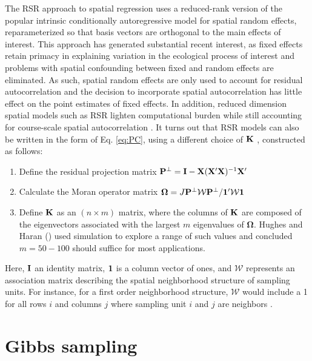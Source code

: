 \documentclass[12pt,fleqn]{article}
\begin{document}
\begin{flushleft}
The RSR approach to spatial regression uses a reduced-rank version of the popular intrinsic conditionally autoregressive \citep[ICAR;][]{Besag1995,Rue2005} model for spatial random effects, reparameterized so that basis vectors are orthogonal to the main effects of interest.  This approach has generated substantial recent interest, as fixed effects retain primacy in explaining variation in the ecological process of interest and problems with spatial confounding between fixed and random effects are eliminated. As such, spatial random effects are only used to account for residual autocorrelation \citep{Reich2006,Hodges2010} and the decision to incorporate spatial autocorrelation has little effect on the point estimates of fixed effects.  In addition, reduced dimension spatial models such as RSR lighten computational burden while still accounting for course-scale spatial autocorrelation \citep[see e.g.][]{LatimerEtAl2009,Wikle2010,Hughes2013}.  It turns out that RSR models can also be written in the form of Eq. \ref{eq:PC}, using a
different choice of ${\bf K}$ \citep{Hughes2013}, constructed as follows:
\begin{enumerate}
  \item Define the residual projection matrix ${\bf P}^\perp={\bf I}-{\bf X}({\bf X}^\prime{\bf X})^{-1}{\bf X}^\prime$
  \item Calculate the Moran operator matrix $\boldsymbol{\Omega}=J{\bf P}^\perp \mathcal{W}{\bf P}^\perp/{\bf 1}^\prime \mathcal{W} {\bf 1}$
  \item Define ${\bf K}$ as an $(n \times m)$ matrix, where the columns of ${\bf K}$ are composed of the eigenvectors  associated with the largest $m$ eigenvalues of $\boldsymbol{\Omega}$. Hughes and Haran (\citeyear{Hughes2013}) used simulation to explore a range of such values and concluded $m=50-100$ should suffice for most applications.
\end{enumerate}
Here, ${\bf I}$ an identity matrix, ${\bf 1}$ is a column vector of ones, and $\mathcal{W}$ represents an association matrix describing the spatial neighborhood structure of sampling units.  For instance, for a first order neighborhood structure, $\mathcal{W}$ would include a 1 for all rows $i$ and columns $j$ where sampling unit $i$ and $j$ are neighbors \citep[see][for alternative association matrices]{Rue2005}.

\section{Gibbs sampling}


\end{flushleft}
\end{document}
